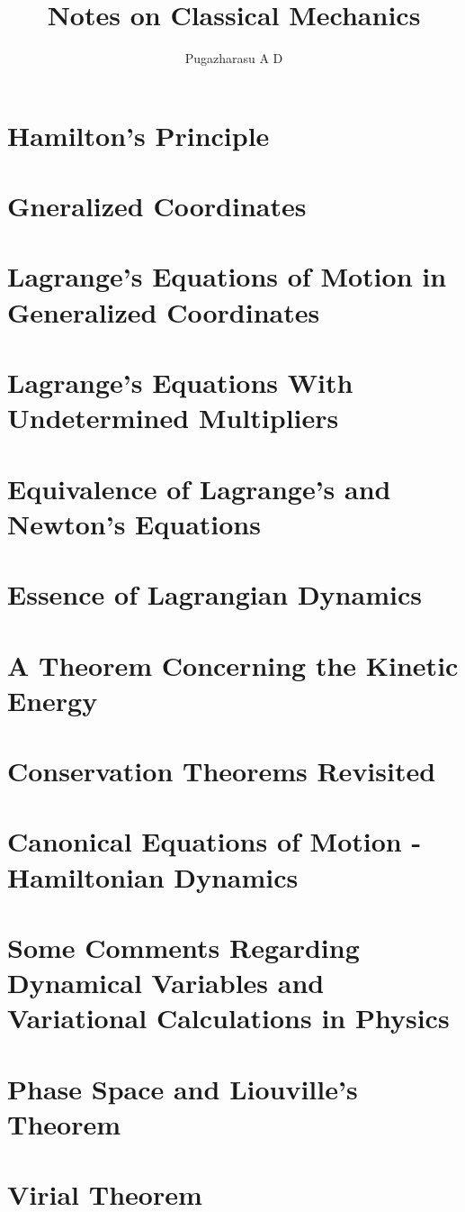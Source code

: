 \documentclass[]{article}
\title{Notes on Classical Mechanics}
\author{Pugazharasu A D}
\begin{document}
\maketitle

\begin{abstract}

\end{abstract}

\section{Hamilton's Principle}
\section{Gneralized Coordinates}
\section{Lagrange's Equations of Motion in Generalized Coordinates}
\section{Lagrange's Equations With Undetermined Multipliers}
\section{Equivalence of Lagrange's and Newton's Equations}
\section{Essence of Lagrangian Dynamics}
\section{A Theorem Concerning the Kinetic Energy}
\section{Conservation Theorems Revisited}
\section{Canonical Equations of Motion - Hamiltonian Dynamics}
\section{Some Comments Regarding Dynamical Variables and Variational Calculations in Physics}
\section{Phase Space and Liouville's Theorem}
\section{Virial Theorem}
\end{document}
